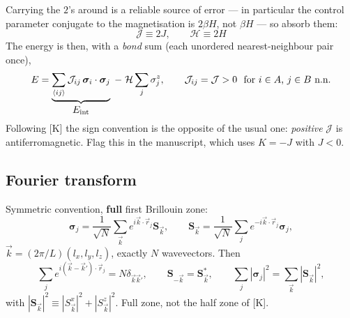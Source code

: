 \documentclass[11pt,a4paper]{article}
\newcommand{\Jc}{\mathcal{J}}
\newcommand{\Hc}{\mathcal{H}}
\newcommand{\bk}{\vec k}
\newcommand{\brr}{\vec r}
\newcommand{\avg}[1]{\left\langle #1 \right\rangle}
\newcommand{\Wc}{\mathcal{W}}
\newcommand{\FLAG}[1]{\textcolor{blue}{\textbf{[#1]}}}
\newcommand{\Jc}{\mathcal{J}}
\newcommand{\Hc}{\mathcal{H}}          %
\newcommand{\bk}{\vec k}
\newcommand{\avg}[1]{\left\langle #1 \right\rangle}
\newcommand{\Wc}{\mathcal{W}}
\newcommand{\FLAG}[1]{\textcolor{blue}{\textbf{[#1]}}}
\begin{document}

Carrying the $2$'s around is a reliable source of error --- in particular the control
parameter conjugate to the magnetisation is $2\beta H$, not $\beta H$ --- so absorb them:
\begin{equation}
  \boxed{\ \Jc\equiv 2J,\qquad \Hc\equiv 2H\ }
\end{equation}
The energy is then, with a \emph{bond} sum (each unordered nearest-neighbour pair once),
\begin{equation}
  E=\underbrace{\sum_{\langle ij\rangle}\Jc_{ij}\,\bm\sigma_i\cdot\bm\sigma_j}_{\textstyle E_{\rm int}}
    \;-\;\Hc\sum_j\sigma^z_j,
  \qquad
  \Jc_{ij}=\Jc>0\ \text{ for $i\in A$, $j\in B$ n.n.}
  \label{eq:energy}
\end{equation}
Following [K] the sign convention is the opposite of the usual one: \emph{positive} $\Jc$
is antiferromagnetic. Flag this in the manuscript, which uses $K=-J$ with $J<0$.

\subsection{Fourier transform}
Symmetric convention, \textbf{full} first Brillouin zone:
\begin{equation}
  \bm\sigma_j=\frac{1}{\sqrt N}\sum_{\bk}e^{i\bk\cdot\brr_j}\bm S_{\bk},
  \qquad
  \bm S_{\bk}=\frac{1}{\sqrt N}\sum_j e^{-i\bk\cdot\brr_j}\bm\sigma_j,
  \label{eq:ft}
\end{equation}
$\bk=(2\pi/L)(l_x,l_y,l_z)$, exactly $N$ wavevectors. Then
\begin{equation}
  \sum_j e^{i(\bk-\bk')\cdot\brr_j}=N\delta_{\bk\bk'},
  \qquad
  \bm S_{-\bk}=\bm S^{*}_{\bk},
  \qquad
  \sum_j|\bm\sigma_j|^2=\sum_{\bk}|\bm S_{\bk}|^2,
  \label{eq:parseval}
\end{equation}
with $|\bm S_{\bk}|^2\equiv|S^x_{\bk}|^2+|S^z_{\bk}|^2$. Full zone, not the half zone of [K].
\end{document}
